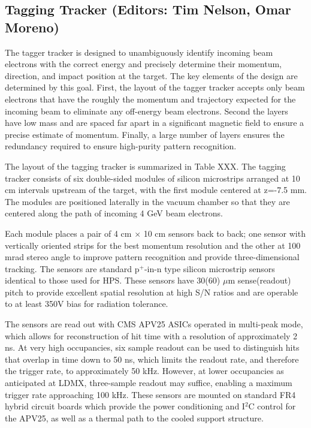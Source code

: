 \subsection{Tagging Tracker (Editors: Tim Nelson, Omar Moreno)}

The tagger tracker is designed to unambiguously identify incoming beam electrons with the correct energy and precisely determine their momentum, direction, and impact position at the target.  The key elements of the design are determined by this goal.  First, the layout of the tagger tracker accepts only beam electrons that have the roughly the momentum and trajectory expected for the incoming beam to eliminate any off-energy beam electrons.  Second the layers have low mass and are spaced far apart in a significant magnetic field to ensure a precise estimate of momentum.  Finally, a large number of layers ensures the redundancy required to ensure high-purity pattern recognition. 

The layout of the tagging tracker is summarized in Table XXX. The tagging tracker consists of six double-sided modules of silicon microstrips arranged at 10 cm intervals upstream of the target, with the first module centered at z=-7.5 mm.  The modules are positioned laterally in the vacuum chamber so that they are centered along the path of incoming 4 GeV beam electrons.

Each module places a pair of 4 cm $\times$ 10 cm sensors back to back; one sensor with vertically oriented strips for the best momentum resolution and the other at 100 mrad stereo angle to improve pattern recognition and provide three-dimensional tracking. The sensors are standard p$^+$-in-n type silicon microstrip sensors identical to those used for HPS.  These sensors have 30(60) $\mu$m sense(readout) pitch to provide excellent spatial resolution at high S/N ratios and are operable to at least 350V bias for radiation tolerance.

The sensors are read out with CMS APV25 ASICs operated in multi-peak mode, which allows for reconstruction of hit time with a resolution of approximately 2 ns. At very high occupancies, six sample readout can be used to distinguish hits that overlap in time down to 50 ns, which limits the readout rate, and therefore the trigger rate, to approximately 50 kHz.  However, at lower occupancies as anticipated at LDMX, three-sample readout may suffice, enabling a maximum trigger rate approaching 100 kHz.  These sensors are mounted on standard FR4 hybrid circuit boards which provide the power conditioning and I$^2$C control for the APV25, as well as a thermal path to the cooled support structure.

